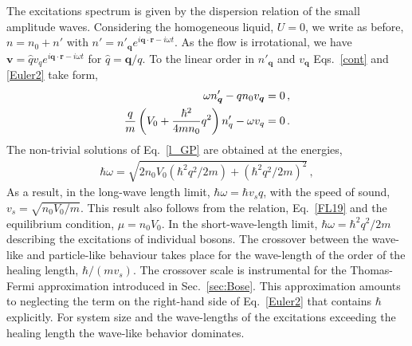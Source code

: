 The excitations spectrum is given by the dispersion relation of the small amplitude waves.
Considering the homogeneous liquid, $U=0$, we write as before, $n = n_0 + n'$ with $n' = n'_{\bm{q}}e^{ i \bm{q} \cdot \bm{r} - i \omega t}$.
As the flow is irrotational, we have $\bm{v} = \hat{q} v_q e^{ i \bm{q} \cdot \bm{r} - i \omega t}$ for $\hat{q} =\bm{q} /q$. 
To the linear order in $n'_{\bm{q}}$ and $v_{\bm{q}}$ Eqs.~\eqref{cont} and \eqref{Euler2} take form,
\begin{align}\label{l_GP}
\omega n'_{\bm{q}} - q n_0 v_{\bm{q}}& = 0\, ,
\notag \\
\frac{q}{m} \left(V_0 + \frac{ \hbar^2 }{ 4 m n_0 }  q^2 \right)n'_{q} -   \omega v_q & = 0\, .
\end{align}
The non-trivial solutions of Eq.~\eqref{l_GP} are obtained at the energies,
\begin{align}
\hbar \omega = \sqrt{ 2 n_0 V_0 ( \hbar^2 q^2 / 2 m ) + ( \hbar^2 q^2 / 2 m )^2}\, ,
\end{align}
As a result, in the long-wave length limit, $\hbar \omega = \hbar v_s q$, with the speed of sound,
$v_s = \sqrt{ n_0 V_0/m}$.
This result also follows from the relation, Eq.~\eqref{FL19} and the equilibrium condition, $ \mu = n_0 V_0$.
In the short-wave-length limit,   $\hbar \omega = \hbar^2 q^2/ 2 m$ describing the excitations of individual bosons.
The crossover between the wave-like and particle-like behaviour takes place for the wave-length of the order of the healing length,
$\hbar/(m v_s)$. 
The crossover scale is instrumental for the Thomas-Fermi approximation introduced in Sec.~\ref{sec:Bose}.
This approximation amounts to neglecting the term on the right-hand side of Eq.~\eqref{Euler2} that contains $\hbar$ explicitly.
For system size and the wave-lengths of the excitations exceeding the healing length the wave-like behavior dominates.

 


 



